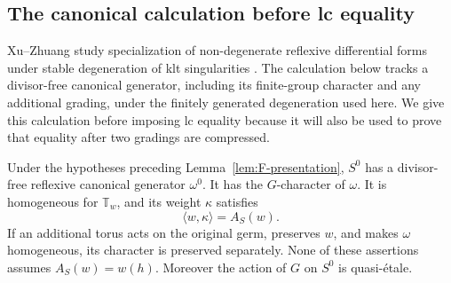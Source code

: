 \subsection{The canonical calculation before lc equality}

Xu--Zhuang study specialization of non-degenerate reflexive
differential forms under stable degeneration of klt singularities
\cite[Theorem~1.1 and Section~3]{XuZhuangForms}.
The calculation below tracks a divisor-free canonical generator,
including its finite-group character and any additional grading,
under the finitely generated degeneration used here.  We give this
calculation before imposing lc equality because it will also be used
to prove that equality after two gradings are compressed.

\begin{proposition}
\label{prop:F-canonical-degeneration}
Under the hypotheses preceding Lemma~\ref{lem:F-presentation},
$S^0$ has a divisor-free reflexive canonical generator $\omega^0$.
It has the $G$-character of $\omega$.  It is homogeneous for
$\mathbb T_w$, and its weight $\kappa$ satisfies
\begin{equation}\label{eq:F-canonical-weight}
 \langle w,\kappa\rangle=A_S(w).
\end{equation}
If an additional torus acts on the original germ, preserves $w$,
and makes $\omega$ homogeneous, its character is preserved
separately.  None of these assertions assumes $A_S(w)=w(h)$.
Moreover the action of $G$ on $S^0$ is quasi-\'{e}tale.
\end{proposition}

